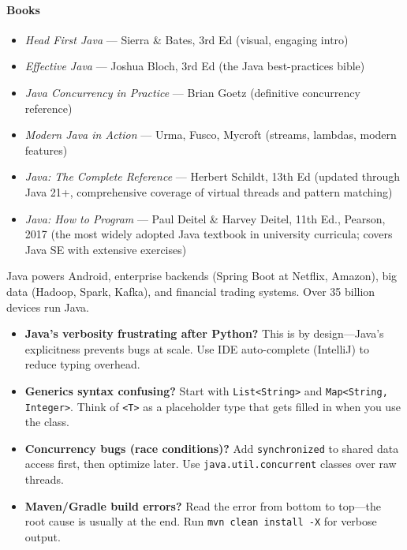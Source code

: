 \documentclass[11pt, a4paper, oneside]{report}
\begin{document}
\paragraph{Books}
\begin{itemize}[leftmargin=*]
\item \emph{Head First Java} --- Sierra \& Bates, 3rd Ed (visual, engaging intro)
\item \emph{Effective Java} --- Joshua Bloch, 3rd Ed (the Java best-practices bible)
\item \emph{Java Concurrency in Practice} --- Brian Goetz (definitive concurrency reference)
\item \emph{Modern Java in Action} --- Urma, Fusco, Mycroft (streams, lambdas, modern features)
\item \emph{Java: The Complete Reference} --- Herbert Schildt, 13th Ed (updated through Java 21+, comprehensive coverage of virtual threads and pattern matching)
\item \emph{Java: How to Program} --- Paul Deitel \& Harvey Deitel, 11th Ed., Pearson, 2017 (the most widely adopted Java textbook in university curricula; covers Java SE with extensive exercises)
\end{itemize}


\begin{realworldbox}
Java powers Android, enterprise backends (Spring Boot at Netflix, Amazon), big data (Hadoop, Spark, Kafka), and financial trading systems. Over 35 billion devices run Java.
\end{realworldbox}


\begin{stuckbox}
\begin{itemize}[leftmargin=*]
\item \textbf{Java's verbosity frustrating after Python?} This is by design---Java's explicitness prevents bugs at scale. Use IDE auto-complete (IntelliJ) to reduce typing overhead.
\item \textbf{Generics syntax confusing?} Start with \texttt{List<String>} and \texttt{Map<String, Integer>}. Think of \texttt{<T>} as a placeholder type that gets filled in when you use the class.
\item \textbf{Concurrency bugs (race conditions)?} Add \texttt{synchronized} to shared data access first, then optimize later. Use \texttt{java.util.concurrent} classes over raw threads.
\item \textbf{Maven/Gradle build errors?} Read the error from bottom to top---the root cause is usually at the end. Run \texttt{mvn clean install -X} for verbose output.
\end{itemize}
\end{stuckbox}
\end{document}
